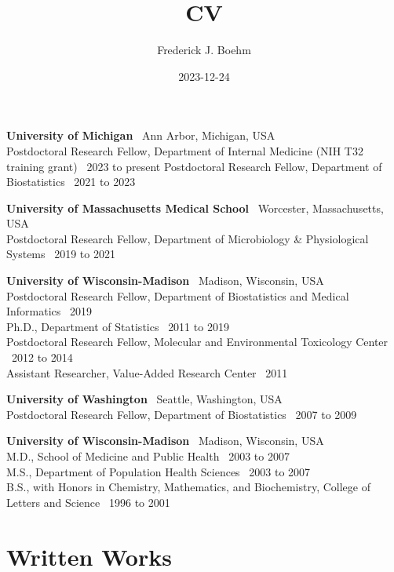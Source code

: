 \documentclass[
  11pt,
  letterpaper,
  DIV=11,
  numbers=noendperiod]{scrartcl}
\title{CV}
\author{Frederick J. Boehm}
\date{2023-12-24}
\begin{document}
\maketitle
\ifdefined\Shaded\renewenvironment{Shaded}{\begin{tcolorbox}[borderline west={3pt}{0pt}{shadecolor}, boxrule=0pt, sharp corners, frame hidden, enhanced, breakable, interior hidden]}{\end{tcolorbox}}\fi

\textbf{University of Michigan} \hfill~{Ann Arbor, Michigan, USA}\\
Postdoctoral Research Fellow, Department of Internal Medicine (NIH T32
training grant) \hfill~{2023 to present} Postdoctoral Research Fellow,
Department of Biostatistics \hfill~{2021 to 2023}

\textbf{University of Massachusetts Medical School} \hfill~{Worcester,
Massachusetts, USA}\\
Postdoctoral Research Fellow, Department of Microbiology \&
Physiological Systems \hfill~{2019 to 2021}

\textbf{University of Wisconsin-Madison} \hfill~{Madison, Wisconsin,
USA}\\
Postdoctoral Research Fellow, Department of Biostatistics and Medical
Informatics \hfill~{2019}\\
Ph.D., Department of Statistics \hfill~{2011 to 2019}\\
Postdoctoral Research Fellow, Molecular and Environmental Toxicology
Center \hfill~{2012 to 2014}\\
Assistant Researcher, Value-Added Research Center \hfill~{2011}

\textbf{University of Washington} \hfill~{Seattle, Washington, USA}\\
Postdoctoral Research Fellow, Department of Biostatistics \hfill~{2007
to 2009}

\textbf{University of Wisconsin-Madison} \hfill~{Madison, Wisconsin,
USA}\\
M.D., School of Medicine and Public Health \hfill~{2003 to 2007}\\
M.S., Department of Population Health Sciences \hfill~{2003 to 2007}\\
B.S., with Honors in Chemistry, Mathematics, and Biochemistry, College
of Letters and Science \hfill~{1996 to 2001}

\hypertarget{written-works}{%
\section{Written Works}\label{written-works}}
\end{document}
